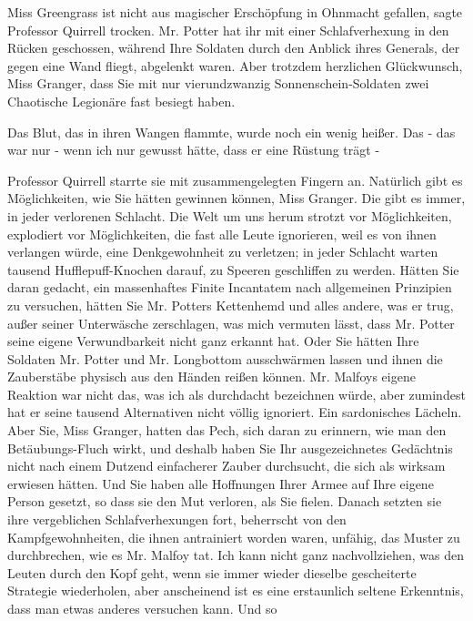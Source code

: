 \glqq{}Miss Greengrass ist nicht aus magischer Erschöpfung in Ohnmacht
gefallen\grqq{}, sagte Professor Quirrell trocken. \glqq{}Mr. Potter hat ihr mit
einer Schlafverhexung in den Rücken geschossen, während Ihre Soldaten durch den
Anblick ihres Generals, der gegen eine Wand fliegt, abgelenkt waren. Aber
trotzdem herzlichen Glückwunsch, Miss Granger, dass Sie mit nur vierundzwanzig
Sonnenschein-Soldaten zwei Chaotische Legionäre fast besiegt haben.\grqq{}

Das Blut, das in ihren Wangen flammte, wurde noch ein wenig heißer. \glqq{}Das -
das war nur - wenn ich nur gewusst hätte, dass er eine Rüstung trägt -\grqq{}

Professor Quirrell starrte sie mit zusammengelegten Fingern an. \glqq{}Natürlich
gibt es Möglichkeiten, wie Sie hätten gewinnen können, Miss Granger. Die gibt es
immer, in jeder verlorenen Schlacht. Die Welt um uns herum strotzt vor
Möglichkeiten, explodiert vor Möglichkeiten, die fast alle Leute ignorieren,
weil es von ihnen verlangen würde, eine Denkgewohnheit zu verletzen; in jeder
Schlacht warten tausend Hufflepuff-Knochen darauf, zu Speeren geschliffen zu
werden. Hätten Sie daran gedacht, ein massenhaftes Finite Incantatem nach
allgemeinen Prinzipien zu versuchen, hätten Sie Mr. Potters Kettenhemd und alles
andere, was er trug, außer seiner Unterwäsche zerschlagen, was mich vermuten
lässt, dass Mr. Potter seine eigene Verwundbarkeit nicht ganz erkannt hat. Oder
Sie hätten Ihre Soldaten Mr. Potter und Mr. Longbottom ausschwärmen lassen und
ihnen die Zauberstäbe physisch aus den Händen reißen können. Mr. Malfoys eigene
Reaktion war nicht das, was ich als durchdacht bezeichnen würde, aber zumindest
hat er seine tausend Alternativen nicht völlig ignoriert.\grqq{} Ein
sardonisches Lächeln. \glqq{}Aber Sie, Miss Granger, hatten das Pech, sich daran
zu erinnern, wie man den Betäubungs-Fluch wirkt, und deshalb haben Sie Ihr
ausgezeichnetes Gedächtnis nicht nach einem Dutzend einfacherer Zauber
durchsucht, die sich als wirksam erwiesen hätten. Und Sie haben alle Hoffnungen
Ihrer Armee auf Ihre eigene Person gesetzt, so dass sie den Mut verloren, als
Sie fielen. Danach setzten sie ihre vergeblichen Schlafverhexungen fort,
beherrscht von den Kampfgewohnheiten, die ihnen antrainiert worden waren,
unfähig, das Muster zu durchbrechen, wie es Mr. Malfoy tat. Ich kann nicht ganz
nachvollziehen, was den Leuten durch den Kopf geht, wenn sie immer wieder
dieselbe gescheiterte Strategie wiederholen, aber anscheinend ist es eine
erstaunlich seltene Erkenntnis, dass man etwas anderes versuchen kann. Und so
